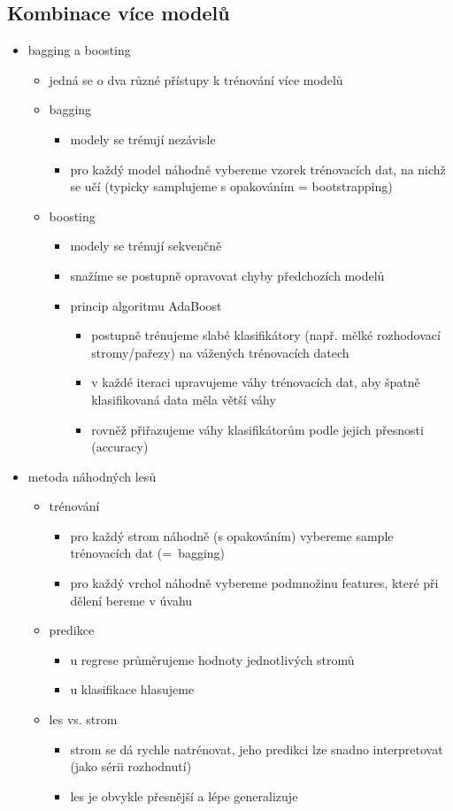 \subsection{Kombinace více modelů}
\begin{itemize}
\item bagging a boosting
\begin{itemize}
\item jedná se o dva různé přístupy k trénování více modelů
\item bagging
\begin{itemize}
\item modely se trénují nezávisle
\item pro každý model náhodně vybereme vzorek trénovacích dat, na nichž se učí (typicky samplujeme s opakováním = bootstrapping)
\end{itemize}
\item boosting
\begin{itemize}
\item modely se trénují sekvenčně
\item snažíme se postupně opravovat chyby předchozích modelů
\item princip algoritmu AdaBoost
\begin{itemize}
\item postupně trénujeme slabé klasifikátory (např. mělké rozhodovací stromy/pařezy) na vážených trénovacích datech
\item v každé iteraci upravujeme váhy trénovacích dat, aby špatně klasifikovaná data měla větší váhy
\item rovněž přiřazujeme váhy klasifikátorům podle jejich přesnosti (accuracy)
\end{itemize}
\end{itemize}
\end{itemize}
\item metoda náhodných lesů
\begin{itemize}
\item trénování
\begin{itemize}
\item pro každý strom náhodně (s opakováním) vybereme sample trénovacích dat (=~bagging)
\item pro každý vrchol náhodně vybereme podmnožinu features, které při dělení bereme v úvahu
\end{itemize}
\item predikce
\begin{itemize}
\item u regrese průměrujeme hodnoty jednotlivých stromů
\item u klasifikace hlasujeme
\end{itemize}
\item les vs. strom
\begin{itemize}
\item strom se dá rychle natrénovat, jeho predikci lze snadno interpretovat (jako sérii rozhodnutí)
\item les je obvykle přesnější a lépe generalizuje
\end{itemize}
\end{itemize}
\end{itemize}
